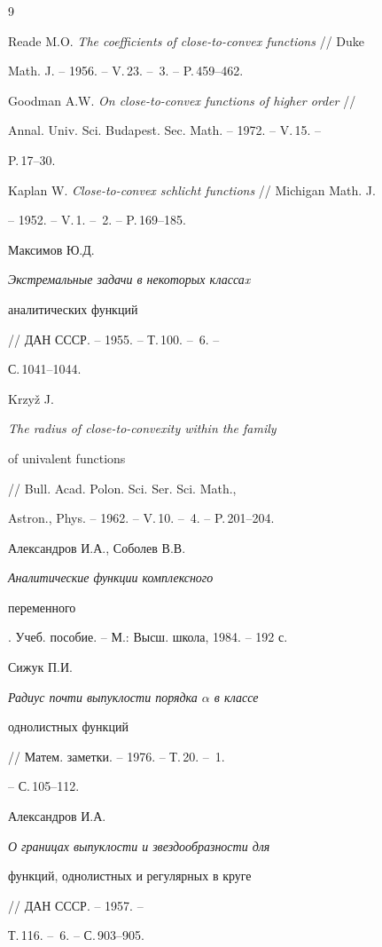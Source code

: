 \begin{thebibliography}{9} 


 




Reade M.O. {\em The coefficients of close-to-convex functions} // Duke 


Math. J. -- 1956. -- V.\,23. -- \No\,3. -- P.\,459--462. 




Goodman A.W. {\em On close-to-convex functions of higher order} // 


Annal. Univ. Sci. Budapest. Sec. Math. -- 1972. -- V.\,15. -- 


P.\,17--30. 




Kaplan W. {\em Close-to-convex schlicht functions} // Michigan Math. J. 


-- 1952. -- V.\,1. -- \No\,2. -- P.\,169--185. 




Максимов Ю.Д. {\em Экстремальные задачи в некоторых классаx 


аналитических функций} // ДАН СССР. -- 1955. -- Т.\,100. -- \No\,6. -- 


С.\,1041--1044. 




Krzy\v z{} J. {\em The radius of close-to-convexity within the family 


of univalent functions} // Bull. Acad. Polon. Sci. Ser. Sci. Math., 


Astron., Phys. -- 1962. -- V.\,10. -- \No\,4. -- P.\,201--204. 




Александров И.А., Соболев В.В. {\em Аналитические функции комплексного 


переменного}. Учеб. пособие. -- М.: Высш. школа, 1984. -- 192 с. 




Сижук П.И. {\em Радиус почти выпуклости порядка $\alpha$ в классе 


однолистных функций} // Матем. заметки. -- 1976. -- Т.\,20. -- \No\,1. 


-- С.\,105--112. 




Александров И.А. {\em О границах выпуклости и звездообразности для 


функций, однолистных и регулярных в круге} // ДАН СССР. -- 1957. -- 


Т.\,116. -- \No\,6. -- С.\,903--905. 


 


\end{thebibliography} 


 


\vskip 0.5cm 


 






 


\label{end} 


 


 


